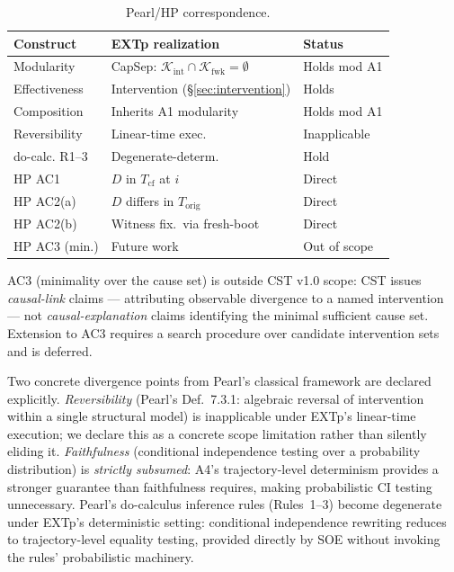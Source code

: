 \documentclass[conference]{IEEEtran}
\newcommand{\Korig}{T_\text{orig}}
\newcommand{\Tcf}{T_\text{cf}}
\newcommand{\Kint}{\mathcal{K}_\text{int}}
\newcommand{\Kfwk}{\mathcal{K}_\text{fwk}}
\begin{document}
\begin{table}[t]
  \caption{Pearl/HP correspondence.}
  \label{tab:pearl}
  \centering
  \small
  \begin{tabular}{@{}p{}p{}p{}@{}}
  \toprule
  Construct       & EXTp realization               & Status \\
  \midrule
  Modularity      & CapSep: $\Kint \cap \Kfwk = \emptyset$ & Holds mod A1 \\
  Effectiveness   & Intervention (\S\ref{sec:intervention})       & Holds \\
  Composition     & Inherits A1 modularity         & Holds mod A1 \\
  Reversibility   & Linear-time exec.              & Inapplicable \\
  do-calc. R1--3  & Degenerate-determ.             & Hold \\
  HP AC1          & $D$ in $\Tcf$ at $i$           & Direct \\
  HP AC2(a)       & $D$ differs in $\Korig$        & Direct \\
  HP AC2(b)       & Witness fix.\ via fresh-boot   & Direct \\
  HP AC3 (min.)   & Future work                    & Out of scope \\
  \bottomrule
  \end{tabular}
\end{table}

AC3 (minimality over the cause set) is outside CST v1.0 scope: CST
issues \emph{causal-link} claims --- attributing observable
divergence to a named intervention --- not
\emph{causal-explanation} claims identifying the minimal sufficient
cause set. Extension to AC3 requires a search procedure over
candidate intervention sets and is deferred.

Two concrete divergence points from Pearl's classical framework are
declared explicitly. \emph{Reversibility} (Pearl's Def.~7.3.1:
algebraic reversal of intervention within a single structural model)
is inapplicable under EXTp's linear-time execution; we declare this
as a concrete scope limitation rather than silently eliding it.
\emph{Faithfulness} (conditional independence testing over a
probability distribution) is \emph{strictly subsumed}: A4's
trajectory-level determinism provides a stronger guarantee than
faithfulness requires, making probabilistic CI testing unnecessary.
Pearl's do-calculus inference rules (Rules~1--3) become degenerate
under EXTp's deterministic setting: conditional independence
rewriting reduces to trajectory-level equality testing, provided
directly by SOE without invoking the rules' probabilistic machinery.
\end{document}
